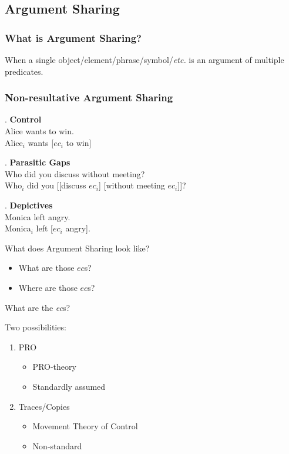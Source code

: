 \documentclass{beamer}
\begin{document}
\subsection{Argument Sharing}
\begin{frame}
  \frametitle{What is Argument Sharing?}
  When a single object/element/phrase/symbol/\textit{etc.} is an argument of multiple predicates.
\end{frame}
\begin{frame}
  \frametitle{Non-resultative Argument Sharing}
  \pause
  \ex. \textbf{Control}\\
    {\rm Alice wants to win.}\\
    Alice$_i$ wants [$ec_i$ to win]

  \pause
\ex. \textbf{Parasitic Gaps}\\
    {\rm Who did you discuss without meeting?}\\
    Who$_i$ did you [[discuss $ec_i$] [without meeting $ec_i$]]?
    
    \pause
    \ex. \textbf{Depictives}\\
    {\rm Monica left angry.}\\
    Monica$_i$ left [$ec_i$ angry].

\end{frame}
\begin{frame}
  {What does Argument Sharing look like?}
  \begin{itemize}
    \item What are those $ec$s?
    \item Where are those $ec$s?
  \end{itemize}
  
\end{frame}
\begin{frame}
  {What are the \textit{ec}s?}
  \begin{block}
    {Two possibilities:}
    \begin{enumerate}
      \item PRO
	\begin{itemize}
	  \item PRO-theory \parencite{chomsky1993lectures,culicover2001control,landau2003movement}
	  \item Standardly assumed
	\end{itemize}
      \item Traces/Copies
	\begin{itemize}
	  \item Movement Theory of Control \parencite{hornstein1999movement,boeckx2003reply,boeckx2006virtues}
	  \item Non-standard
	\end{itemize}
    \end{enumerate}
  \end{block}
\end{frame}
\end{document}
